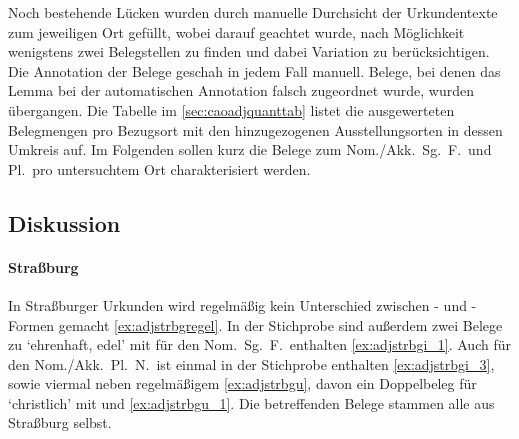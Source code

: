 Noch bestehende Lücken wurden durch manuelle Durchsicht der Urkundentexte zum
jeweiligen Ort gefüllt, wobei darauf geachtet wurde, nach Möglichkeit
wenigstens zwei Belegstellen zu finden und dabei Variation zu berücksichtigen.
Die Annotation der Belege geschah in jedem Fall manuell. Belege, bei denen das
Lemma bei der automatischen Annotation falsch zugeordnet wurde, wurden
übergangen. Die Tabelle im \cref{sec:caoadjquanttab} listet die ausgewerteten
Belegmengen pro Bezugsort mit den hinzugezogenen Ausstellungs\-orten in dessen
Umkreis auf. Im Folgenden sollen kurz die Belege zum Nom./Akk.\ Sg.\ F.\ und
Pl.\ pro untersuchtem Ort charakterisiert werden.

\subsection{Diskussion}
\label{subsec:cao_adjflex_disc}

\paragraph{Straßburg}
\label{par:adjstrassburg}
In Straßburger Urkunden wird regelmäßig kein Unterschied zwischen - und
-Formen gemacht \cref{ex:adjstrbgregel}. In der Stichprobe sind
außerdem zwei Belege zu
 `ehrenhaft, edel' mit  für den Nom.\ Sg.\ F.\
enthalten \cref{ex:adjstrbgi_1}. Auch für den Nom./Akk.\ Pl.\ N.\ ist einmal
\lit{-i} in der Stichprobe enthalten \cref{ex:adjstrbgi_3}, sowie viermal
\lit{-u/-û} neben regelmäßigem  \cref{ex:adjstrbgu}, davon ein
Doppelbeleg für \norm{kristenlich} `christlich' mit \lit{-u} und
\lit{-e} \cref{ex:adjstrbgu_1}. Die betreffenden Belege stammen alle aus
Straßburg selbst.


